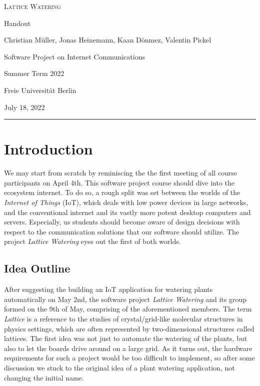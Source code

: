 \documentclass[10pt, a4paper]{article}
\begin{document}
    \begin{center}
        \large \textsc{Lattice Watering}

        \vspace{\baselineskip}

        \normalsize Handout

        \vspace{\baselineskip}

        Christian Müller, Jonas Heinemann, Kaan Dönmez, Valentin Pickel

        \vspace{\baselineskip}

        Software Project on Internet Communications
        
        Summer Term 2022

        Freie Universität Berlin

        \vspace{\baselineskip}

        July 18, 2022
    \end{center}

    \rule{\linewidth}{0.5pt}

    \section{Introduction}

    We may start from scratch by reminiscing the the first meeting of all course participants on April 4th. This software project course should dive into the ecosystem internet. To do so, a rough split was set between the worlds of the \emph{Internet of Things} (IoT), which deals with low power devices in large networks, and the conventional internet and its vastly more potent desktop computers and servers. Especially, us students should become aware of design decisions with respect to the communication solutions that our software should utilize. The project \emph{Lattice Watering} eyes out the first of both worlds.

    \subsection{Idea Outline}

    After suggesting the building an IoT application for watering plants automatically on May 2nd, the software project \emph{Lattice Watering} and its group formed on the 9th of May, comprising of the aforementioned members. The term \emph{Lattice} is a reference to the studies of crystal/grid-like molecular structures in physics settings, which are often represented by two-dimensional structures called lattices. The first idea was not just to automate the watering of the plants, but also to let the boards drive around on a large grid. As it turns out, the hardware requirements for such a project would be too difficult to implement, so after some discussion we stuck to the original idea of a plant watering application, not changing the initial name.
\end{document}
